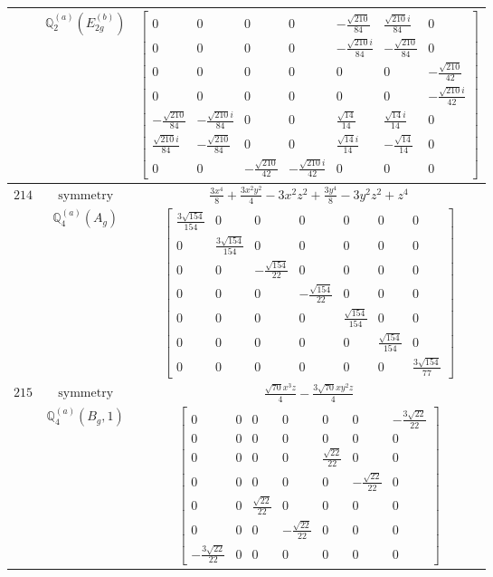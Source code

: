 \documentclass[fleqn,8pt,landscape]{jsarticle}
\begin{document}
\begin{longtable}{ccc}
$  $ & $ \mathbb{Q}_{2}^{(a)}(E_{2g}^{(b)}) $ & $ \begin{bmatrix} 0 & 0 & 0 & 0 & - \frac{\sqrt{210}}{84} & \frac{\sqrt{210} i}{84} & 0 \\ 0 & 0 & 0 & 0 & - \frac{\sqrt{210} i}{84} & - \frac{\sqrt{210}}{84} & 0 \\ 0 & 0 & 0 & 0 & 0 & 0 & - \frac{\sqrt{210}}{42} \\ 0 & 0 & 0 & 0 & 0 & 0 & - \frac{\sqrt{210} i}{42} \\ - \frac{\sqrt{210}}{84} & - \frac{\sqrt{210} i}{84} & 0 & 0 & \frac{\sqrt{14}}{14} & \frac{\sqrt{14} i}{14} & 0 \\ \frac{\sqrt{210} i}{84} & - \frac{\sqrt{210}}{84} & 0 & 0 & \frac{\sqrt{14} i}{14} & - \frac{\sqrt{14}}{14} & 0 \\ 0 & 0 & - \frac{\sqrt{210}}{42} & - \frac{\sqrt{210} i}{42} & 0 & 0 & 0 \end{bmatrix} $ \\ \hline
$ 214 $ & $ \text{symmetry} $ & $ \frac{3 x^{4}}{8} + \frac{3 x^{2} y^{2}}{4} - 3 x^{2} z^{2} + \frac{3 y^{4}}{8} - 3 y^{2} z^{2} + z^{4} $ \\
$  $ & $ \mathbb{Q}_{4}^{(a)}(A_{g}) $ & $ \begin{bmatrix} \frac{3 \sqrt{154}}{154} & 0 & 0 & 0 & 0 & 0 & 0 \\ 0 & \frac{3 \sqrt{154}}{154} & 0 & 0 & 0 & 0 & 0 \\ 0 & 0 & - \frac{\sqrt{154}}{22} & 0 & 0 & 0 & 0 \\ 0 & 0 & 0 & - \frac{\sqrt{154}}{22} & 0 & 0 & 0 \\ 0 & 0 & 0 & 0 & \frac{\sqrt{154}}{154} & 0 & 0 \\ 0 & 0 & 0 & 0 & 0 & \frac{\sqrt{154}}{154} & 0 \\ 0 & 0 & 0 & 0 & 0 & 0 & \frac{3 \sqrt{154}}{77} \end{bmatrix} $ \\ \hline
$ 215 $ & $ \text{symmetry} $ & $ \frac{\sqrt{70} x^{3} z}{4} - \frac{3 \sqrt{70} x y^{2} z}{4} $ \\
$  $ & $ \mathbb{Q}_{4}^{(a)}(B_{g},1) $ & $ \begin{bmatrix} 0 & 0 & 0 & 0 & 0 & 0 & - \frac{3 \sqrt{22}}{22} \\ 0 & 0 & 0 & 0 & 0 & 0 & 0 \\ 0 & 0 & 0 & 0 & \frac{\sqrt{22}}{22} & 0 & 0 \\ 0 & 0 & 0 & 0 & 0 & - \frac{\sqrt{22}}{22} & 0 \\ 0 & 0 & \frac{\sqrt{22}}{22} & 0 & 0 & 0 & 0 \\ 0 & 0 & 0 & - \frac{\sqrt{22}}{22} & 0 & 0 & 0 \\ - \frac{3 \sqrt{22}}{22} & 0 & 0 & 0 & 0 & 0 & 0 \end{bmatrix} $ \\ \hline

\end{longtable}
\end{document}
